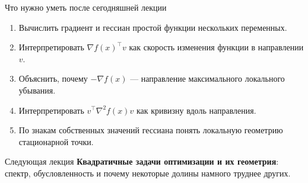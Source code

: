 \documentclass[aspectratio=169,10pt]{beamer}
\newcommand{\grad}{\nabla}
\newcommand{\Hess}{\nabla^2}
\begin{document}
\begin{frame}{Что нужно уметь после сегодняшней лекции}
\vspace{0.25em}

\begin{enumerate}
  \item Вычислить градиент и гессиан простой функции нескольких переменных.
  \item Интерпретировать $\grad f(x)^\top v$ как скорость изменения функции в направлении $v$.
  \item Объяснить, почему $-\grad f(x)$ --- направление максимального локального убывания.
  \item Интерпретировать $v^\top\Hess f(x)v$ как кривизну вдоль направления.
  \item По знакам собственных значений гессиана понять локальную геометрию стационарной точки.
\end{enumerate}

\vspace{0.55em}

\begin{alertblock}{Следующая лекция}
\centering
\textbf{Квадратичные задачи оптимизации и их геометрия}: спектр, обусловленность и почему некоторые долины намного труднее других.
\end{alertblock}

\end{frame}
\end{document}
